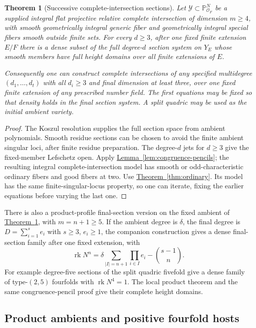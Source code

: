 \documentclass[11pt,a4paper]{article}
\newtheorem{theorem}{Theorem}[section]
\theoremstyle{definition}
\theoremstyle{remark}\newtheorem{remark}[theorem]{Remark}
\numberwithin{equation}{section}
\newcommand{\PP}{\mathbb P}\newcommand{\LL}{\mathbb L}
\newcommand{\rk}{\operatorname{rk}}\newcommand{\im}{\operatorname{im}}
\newcommand{\thmref}[1]{\hyperref[#1]{\textcolor{resultlink}{Theorem~\ref*{#1}}}}
\newcommand{\lemref}[1]{\hyperref[#1]{\textcolor{resultlink}{Lemma~\ref*{#1}}}}
\begin{document}
\begin{theorem}[Successive complete-intersection sections]\label{thm:dense-ci}
Let $\mathcal Y\subset\PP^N_{\mathcal O_F}$ be a supplied
integral flat projective relative complete intersection of dimension
$m\geq4$, with smooth geometrically integral generic fiber and
geometrically integral special fibers smooth outside finite sets.
For every $d\geq3$, after one fixed finite extension $E/F$ there
is a dense subset of the full degree-$d$ section system on $Y_E$
whose smooth members have full height domains over all finite
extensions of $E$.

Consequently one can construct complete intersections of any
specified multidegree $(d_1,\ldots,d_t)$ with all $d_i\geq3$
and final dimension at least three, over one fixed finite extension
of any prescribed number field. The first equations may be fixed
so that density holds in the final section system. A split quadric
may be used as the initial ambient variety.
\end{theorem}

\begin{proof}
The Koszul resolution supplies the full section space from ambient
polynomials. Smooth residue sections can be chosen to avoid the
finite ambient singular loci, after finite residue preparation.
The degree-$d$ jets for $d\geq3$ give the fixed-member Lefschetz
open. Apply \lemref{lem:congruence-pencils}; the resulting integral
complete-intersection model has smooth or odd-characteristic
ordinary fibers and good fibers at two. Use
\thmref{thm:ordinary}. Its model has the same finite-singular-locus
property, so one can iterate, fixing the earlier equations before
varying the last one.
\end{proof}

There is also a product-profile final-section version on the fixed
ambient of \thmref{thm:dense-ci}, with $m=n+1\geq5$. If the
ambient degree is $\delta$, the final degree is
$D=\sum_{i=1}^s e_i$ with $s\geq3$, $e_i\geq1$, the companion
construction gives a dense final-section family after one fixed
extension, with
\[
 \rk N^n=\delta\sum_{|I|=n+1}\prod_{i\in I}e_i
                                      -\binom{s-1}{n}.
\]
For example degree-five sections of the split quadric fivefold
give a dense family of type-$(2,5)$ fourfolds with $\rk N^4=1$.
The local product theorem and the same congruence-pencil proof
give their complete height domains.

\subsection{Product ambients and positive fourfold hosts}
\end{document}
